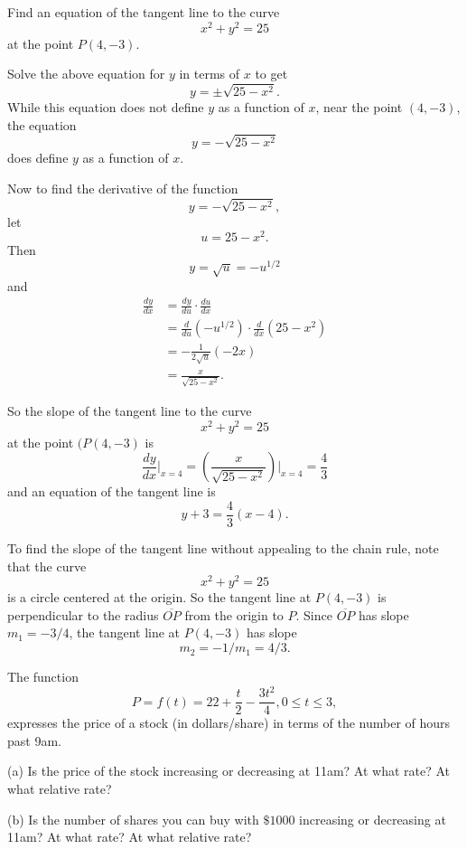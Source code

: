 \documentclass{ximera}
\begin{document}
\begin{example}  \label{Ex:DFdg4ergg}
Find an equation of the tangent line to the curve
\[
     x^2 + y^2 = 25
\]
at the point $P(4,-3)$.

\begin{explanation}
Solve the above equation for $y$ in terms of $x$ to get
\[
      y = \pm \sqrt{25-x^2} .
\] 
While this equation does not define $y$ as a function of $x$, near the point $(4,-3)$, the equation
\[
         y = - \sqrt{25-x^2} 
\]
does define $y$ as a function of $x$.

Now to find the derivative of the function
\[
          y = - \sqrt{25-x^2} ,
\]
let 
\[
       u = 25 - x^2 .
\]
Then
\[
    y = \sqrt{u} = - u^{1/2}
\]
and 
\begin{align*}
\frac{dy}{dx} &= \frac{dy}{du} \cdot \frac{du}{dx}  \\
                     &= \frac{d}{du} \left(- u^{1/2} \right)  \cdot \frac{d}{dx}\left(  25-x^2 \right)  \\
                     &= -\frac{1}{2\sqrt{u}} (-2x)  \\
                     &= \frac{x}{\sqrt{25-x^2}}.
\end{align*}

So the slope of the tangent line to the curve
\[
       x^2 + y^2 =25
\]
at the point $(P(4,-3)$ is
\[
             \frac{dy}{dx}\Big|_{x=4} = \left(  \frac{x}{\sqrt{25-x^2}} \right) \Big|_{x=4} = \frac{4}{3}
\]
and an equation of the tangent line is
\[
     y +3 = \frac{4}{3} (x-4).
\]

To find the slope of the tangent line without appealing to the chain rule, note that the curve
\[
              x^2 + y^2  = 25
\]
is a circle centered at the origin. So the tangent line at $P(4,-3)$ is perpendicular to the radius $\overline{OP}$ from the origin to $P$. Since $\overline{OP}$ has slope $m_1 = -3/4$, the tangent line at $P(4,-3)$ has slope
\[
     m_2 = - 1 / m_1  = 4/3 .
\]
\end{explanation}

\end{example}


\begin{example}  \label{Ex:pdfsd0tr}
The function 
\[
       P  = f(t) = 22 + \frac{t}{2} - \frac{3t^2}{4} , 0\leq t \leq 3 , 
\]
expresses the price of a stock (in dollars/share) in terms of the number of hours past 9am.

(a) Is the price of the stock increasing or decreasing at 11am? At what rate? At what relative rate?

(b) Is the number of shares you can buy with $\$1000$ increasing or decreasing at 11am? At what rate? At what relative rate?
\end{example}
\end{document}
